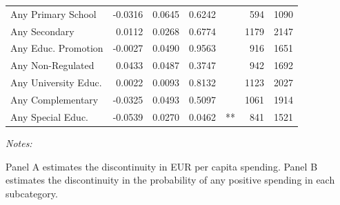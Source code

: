 \begin{table}[!h]
{\begin{threeparttable}
\begin{tabular}[t]{lrrrlrr}
\hspace{1em}Any Primary School & -0.0316 & 0.0645 & 0.6242 &  & 594 & 1090\\
\hspace{1em}Any Secondary & 0.0112 & 0.0268 & 0.6774 &  & 1179 & 2147\\
\hspace{1em}Any Educ. Promotion & -0.0027 & 0.0490 & 0.9563 &  & 916 & 1651\\
\hspace{1em}Any Non-Regulated & 0.0433 & 0.0487 & 0.3747 &  & 942 & 1692\\
\hspace{1em}Any University Educ. & 0.0022 & 0.0093 & 0.8132 &  & 1123 & 2027\\
\hspace{1em}Any Complementary & -0.0325 & 0.0493 & 0.5097 &  & 1061 & 1914\\
\hspace{1em}Any Special Educ. & -0.0539 & 0.0270 & 0.0462 & ** & 841 & 1521\\
\bottomrule
\end{tabular}
\begin{tablenotes}
\item \textit{Notes:} 
\item Panel A estimates the discontinuity in EUR per capita spending. Panel B estimates the discontinuity in the probability of any positive spending in each subcategory.
\end{tablenotes}
\end{threeparttable}}
\end{table}
